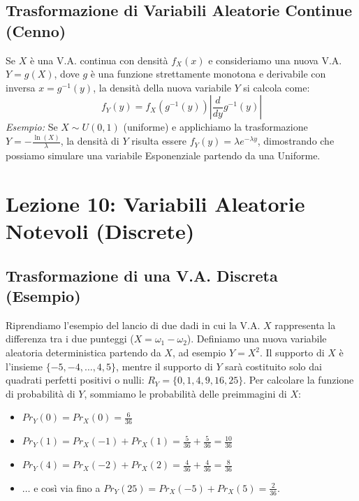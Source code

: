 \documentclass[12pt, a4paper]{article}
\begin{document}
\subsection{Trasformazione di Variabili Aleatorie Continue (Cenno)}
Se $X$ è una V.A. continua con densità $f_X(x)$ e consideriamo una nuova V.A. $Y = g(X)$, dove $g$ è una funzione strettamente monotona e derivabile con inversa $x = g^{-1}(y)$, la densità della nuova variabile $Y$ si calcola come:
$$ f_Y(y) = f_X(g^{-1}(y)) \left| \frac{d}{dy} g^{-1}(y) \right| $$
\textit{Esempio:} Se $X \sim U(0,1)$ (uniforme) e applichiamo la trasformazione $Y = -\frac{\ln(X)}{\lambda}$, la densità di $Y$ risulta essere $f_Y(y) = \lambda e^{-\lambda y}$, dimostrando che possiamo simulare una variabile Esponenziale partendo da una Uniforme.


\section{Lezione 10: Variabili Aleatorie Notevoli (Discrete)}

\subsection{Trasformazione di una V.A. Discreta (Esempio)}
Riprendiamo l'esempio del lancio di due dadi in cui la V.A. $X$ rappresenta la differenza tra i due punteggi ($X = \omega_1 - \omega_2$).
Definiamo una nuova variabile aleatoria deterministica partendo da $X$, ad esempio $Y = X^2$.
Il supporto di $X$ è l'insieme $\{-5, -4, \dots, 4, 5\}$, mentre il supporto di $Y$ sarà costituito solo dai quadrati perfetti positivi o nulli: $R_Y = \{0, 1, 4, 9, 16, 25\}$.
Per calcolare la funzione di probabilità di $Y$, sommiamo le probabilità delle preimmagini di $X$:
\begin{itemize}
    \item $Pr_Y(0) = Pr_X(0) = \frac{6}{36}$
    \item $Pr_Y(1) = Pr_X(-1) + Pr_X(1) = \frac{5}{36} + \frac{5}{36} = \frac{10}{36}$
    \item $Pr_Y(4) = Pr_X(-2) + Pr_X(2) = \frac{4}{36} + \frac{4}{36} = \frac{8}{36}$
    \item $\dots$ e così via fino a $Pr_Y(25) = Pr_X(-5) + Pr_X(5) = \frac{2}{36}$.
\end{itemize}
\end{document}
